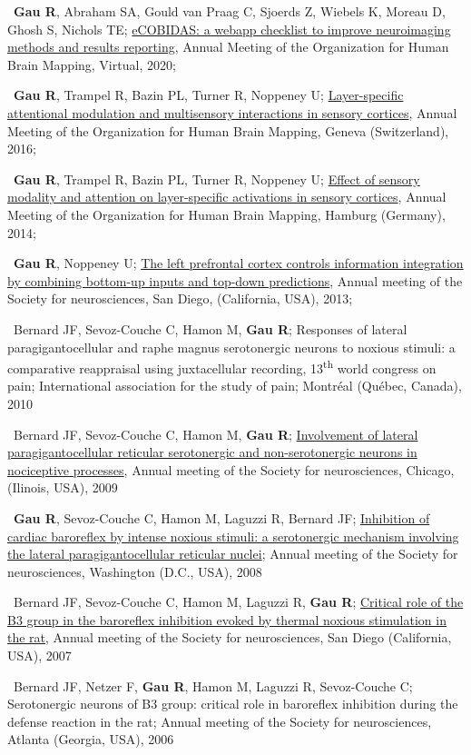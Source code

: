 \textbullet~\textbf{Gau R}, Abraham SA, Gould van Praag C, Sjoerds Z, Wiebels K, Moreau D, Ghosh S, Nichols TE;
\href{https://osf.io/k8pe6/}{eCOBIDAS: a webapp checklist to improve neuroimaging methods and results reporting}, 
Annual Meeting of the Organization for Human Brain Mapping, Virtual,  
2020; 

\textbullet~\textbf{Gau R}, Trampel R, Bazin PL, Turner R, Noppeney U; 
\href{https://osf.io/k8pe6/}{Layer-specific attentional modulation and multisensory interactions in sensory cortices}, 
Annual Meeting of the Organization for Human Brain Mapping, Geneva (Switzerland), 
2016; 

\textbullet~\textbf{Gau R}, Trampel R, Bazin PL, Turner R, Noppeney U; 
\href{https://osf.io/htgk6/}{Effect of sensory modality and attention on layer-specific activations in sensory cortices}, 
Annual Meeting of the Organization for Human Brain Mapping, Hamburg (Germany), 
2014; 

\textbullet~\textbf{Gau R}, Noppeney U; \href{https://osf.io/35jkh/}{The left prefrontal cortex controls information integration by combining bottom-up inputs and top-down predictions}, 
Annual meeting of the Society for neurosciences, 
San Diego, (California, USA), 
2013; 

\textbullet~Bernard JF, Sevoz-Couche C, Hamon M, \textbf{Gau R}; Responses of lateral paragigantocellular and raphe magnus serotonergic neurons to noxious stimuli: a comparative reappraisal using juxtacellular recording, 
13\textsuperscript{th} world congress on pain; International association for the study of pain; 
Montréal (Québec, Canada), 
2010

\textbullet~Bernard JF, Sevoz-Couche C, Hamon M, \textbf{Gau R}; \href{https://osf.io/efqub/}{Involvement of lateral paragigantocellular reticular serotonergic and non-serotonergic neurons in nociceptive processes}, 
Annual meeting of the Society for neurosciences, 
Chicago, (Ilinois, USA), 
2009

\textbullet~\textbf{Gau R}, Sevoz-Couche C, Hamon M, Laguzzi R, Bernard JF; 
\href{https://osf.io/hxkgv/}{Inhibition of cardiac baroreflex by intense noxious stimuli: a serotonergic mechanism involving the lateral paragigantocellular reticular nuclei}; 
Annual meeting of the Society for neurosciences, 
Washington (D.C., USA), 
2008

\textbullet~Bernard JF, Sevoz-Couche C, Hamon M, Laguzzi R, \textbf{Gau R}; 
\href{https://osf.io/4rjst/}{Critical role of the B3 group in the baroreflex inhibition evoked by thermal noxious stimulation in the rat}, 
Annual meeting of the Society for neurosciences, 
San Diego (California, USA), 
2007

\textbullet~Bernard JF, Netzer F, \textbf{Gau R}, Hamon M, Laguzzi R, Sevoz-Couche C; 
Serotonergic neurons of B3 group: critical role in baroreflex inhibition during the defense reaction in the rat; 
Annual meeting of the Society for neurosciences, 
Atlanta (Georgia, USA), 
2006
